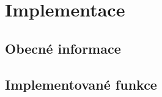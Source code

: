 \chapter{Implementace}  \label{kapImpl}
    
    \section{Obecné informace}




    \section{Implementované funkce}



